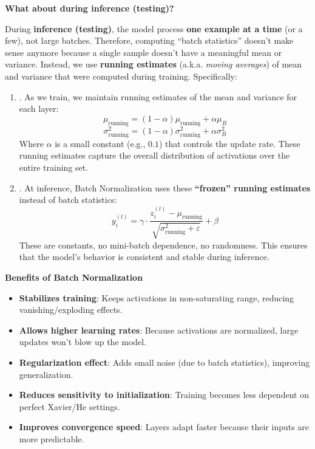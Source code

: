 \highspace
\begin{flushleft}
    \textcolor{Green3}{ \textbf{What about during inference (testing)?}}
\end{flushleft}
During \textbf{inference (testing)}, the model process \textbf{one example at a time} (or a few), not large batches. Therefore, computing ``batch statistics'' doesn't make sense anymore because a single sample doesn't have a meaningful mean or variance. Instead, we use \textbf{running estimates} (a.k.a. \emph{moving averages}) of mean and variance that were computed during training. Specifically:
\begin{enumerate}
    \item {}. As we train, we maintain running estimates of the mean and variance for each layer:
    \begin{equation}
        \mu_{\text{running}} = (1 - \alpha) \mu_{\text{running}} + \alpha \mu_B
    \end{equation}
    \begin{equation}
        \sigma_{\text{running}}^2 = (1 - \alpha) \sigma_{\text{running}}^2 + \alpha \sigma_B^2
    \end{equation}
    Where $\alpha$ is a small constant (e.g., $0.1$) that controls the update rate. These running estimates capture the overall distribution of activations over the entire training set.

    \item {}. At inference, Batch Normalization uses these \textbf{``frozen'' running estimates} instead of batch statistics:
    \begin{equation*}
        y_i^{(l)} = \gamma \cdot \dfrac{z_i^{(l)} - \mu_{\text{running}}}{\sqrt{\sigma_{\text{running}}^2 + \varepsilon}} + \beta
    \end{equation*}
    These are constants, no mini-batch dependence, no randomness. This ensures that the model's behavior is consistent and stable during inference.
\end{enumerate}

\highspace
\begin{flushleft}
    \textcolor{Green3}{ \textbf{Benefits of Batch Normalization}}
\end{flushleft}
\begin{itemize}
    \item \textbf{Stabilizes training}: Keeps activations in non-saturating range, reducing vanishing/exploding effects.
    \item \textbf{Allows higher learning rates}: Because activations are normalized, large updates won't blow up the model.
    \item \textbf{Regularization effect}: Adds small noise (due to batch statistics), improving generalization.
    \item \textbf{Reduces sensitivity to initialization}: Training becomes less dependent on perfect Xavier/He settings.
    \item \textbf{Improves convergence speed}: Layers adapt faster because their inputs are more predictable.
\end{itemize}

